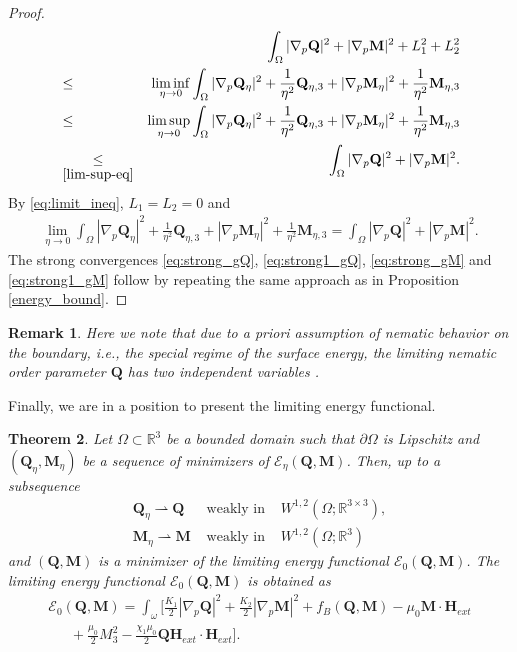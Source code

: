 \documentclass{article}
\newtheorem{theorem}{Theorem}[section]
\newtheorem{remark}[theorem]{Remark}
\def\Qvec{\mathbf{Q}}
\def \Mvec{\mathbf{M}}
\def\Hvec{\mathbf{H}}
\begin{document}
\begin{proof}
\begin{eqnarray}
& &\int_{\Omega}|\nabla_p\Qvec|^2+|\nabla_p\Mvec|^2+L^2_1+L_2^2\nonumber\\
&\le&\liminf_{\eta\rightarrow 0}\int_{\Omega}|\nabla_p\Qvec_{\eta}|^2+\frac{1}{\eta^2}\Qvec_{\eta,3}+|\nabla_p\Mvec_{\eta}|^2+\frac{1}{\eta^2}\Mvec_{\eta,3}\nonumber\\
&\le&\limsup_{\eta\rightarrow 0}\int_{\Omega}|\nabla_p\Qvec_{\eta}|^2+\frac{1}{\eta^2}\Qvec_{\eta,3}+|\nabla_p\Mvec_{\eta}|^2+\frac{1}{\eta^2}\Mvec_{\eta,3}\nonumber\\
&\underset{\eqref{lim-sup-eq}}{\le}&\int_{\Omega}|\nabla_p\Qvec|^2+|\nabla_p\Mvec|^2.\label{eq:limit_ineq}
\end{eqnarray}
By \eqref{eq:limit_ineq}, $L_1=L_2=0$ and
\begin{eqnarray}
\lim_{\eta\rightarrow 0}\int_{\Omega}|\nabla_p\Qvec_{\eta}|^2+\frac{1}{\eta^2}\Qvec_{\eta,3}+|\nabla_p\Mvec_{\eta}|^2+\frac{1}{\eta^2}\Mvec_{\eta,3}=\int_{\Omega}|\nabla_p\Qvec|^2+|\nabla_p\Mvec|^2.
\end{eqnarray} 
The strong convergences \eqref{eq:strong_gQ}, \eqref{eq:strong1_gQ}, \eqref{eq:strong_gM} and \eqref{eq:strong1_gM} follow by repeating the same approach as in Proposition \ref{energy_bound}.
\end{proof}
\begin{remark}
Here we note that due to a priori assumption of nematic behavior on the boundary, i.e., the special regime of the surface energy, the limiting nematic order parameter $\Qvec$ has two independent variables \cite{golovaty2014minimizers}.
\end{remark}
Finally, we are in a position to present the limiting energy functional.
\begin{theorem}\label{main_theorem}
Let $\Omega\subset\mathbb R^3$ be a bounded domain such that $\partial\Omega$ is Lipschitz and $\left(\Qvec_{\eta}, \Mvec_{\eta}\right)$ be a sequence of minimizers of $\mathcal{E}_{\eta}\left(\Qvec, \Mvec\right)$. Then, up to a subsequence 
\begin{eqnarray}
\Qvec_{\eta}\rightharpoonup\Qvec &\mbox{ weakly in }& W^{1,2}\left(\Omega; \mathbb R^{3\times 3}\right),\label{eq:Q_1}\\
\Mvec_{\eta}\rightharpoonup\Mvec &\mbox{ weakly in }& W^{1,2}\left(\Omega; \mathbb R^3\right)\label{eq:M_1}
\end{eqnarray}
and $\left(\Qvec, \Mvec\right)$ is a minimizer of the limiting energy functional $\mathcal{E}_0\left(\Qvec, \Mvec\right)$. The limiting energy functional $\mathcal{E}_0\left(\Qvec, \Mvec\right)$ is obtained as
\begin{eqnarray}
\mathcal{E}_0\left(\Qvec, \Mvec\right)=\int_{\omega}\bigg[\frac{K_1}{2}|\nabla_p\Qvec|^2+\frac{K_2}{2}|\nabla_p\Mvec|^2+f_B\left(\Qvec, \Mvec\right)-\mu_0\Mvec\cdot\Hvec_{ext}\nonumber\\
~~~~~~~+\frac{\mu_0}{2}M_3^2 - \frac{\chi_1\mu_0}{2}\Qvec\Hvec_{ext}\cdot\Hvec_{ext}\bigg]. \label{eq:energy_reduced}
\end{eqnarray}
\end{theorem} 
\end{document}
